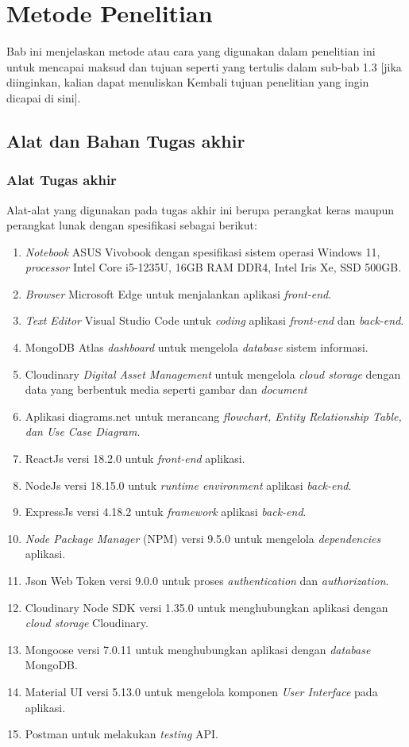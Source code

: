 \chapter{Metode Penelitian}

Bab ini menjelaskan metode atau cara yang digunakan dalam penelitian ini untuk 
mencapai maksud dan tujuan seperti yang tertulis dalam sub-bab 1.3 [jika diinginkan, kalian dapat menuliskan Kembali tujuan penelitian yang ingin dicapai di sini].

\section{Alat dan Bahan Tugas akhir}

\subsection{Alat Tugas akhir}

Alat-alat yang digunakan pada tugas akhir ini berupa perangkat keras maupun perangkat lunak dengan spesifikasi sebagai berikut:

\begin{enumerate}
	\item \textit{Notebook} ASUS Vivobook dengan spesifikasi sistem operasi Windows 11, \textit{processor} Intel Core i5-1235U, 16GB RAM DDR4, Intel Iris Xe, SSD 500GB.
	\item \textit{Browser} Microsoft Edge untuk menjalankan aplikasi \textit{front-end}.
	\item \textit{Text Editor} Visual Studio Code untuk \textit{coding} aplikasi \textit{front-end} dan \textit{back-end}.
	\item MongoDB Atlas \textit{dashboard} untuk mengelola \textit{database} sistem informasi.
	\item Cloudinary \textit{Digital Asset Management} untuk mengelola \textit{cloud storage} dengan data yang berbentuk media seperti gambar dan  \textit{document}
	\item Aplikasi diagrams.net untuk merancang \textit{flowchart, Entity Relationship Table, dan Use Case Diagram}.
	\item ReactJs versi 18.2.0 untuk \textit{front-end} aplikasi.
	\item NodeJs versi 18.15.0 untuk \textit{runtime environment} aplikasi \textit{back-end}.
	\item ExpressJs versi 4.18.2 untuk \textit{framework} aplikasi \textit{back-end}.
	\item \textit{Node Package Manager} (NPM) versi 9.5.0 untuk mengelola \textit{dependencies} aplikasi.
	\item Json Web Token versi 9.0.0 untuk proses \textit{authentication} dan \textit{authorization}.
	\item Cloudinary Node SDK versi 1.35.0 untuk menghubungkan aplikasi dengan \textit{cloud storage} Cloudinary.
	\item Mongoose versi 7.0.11 untuk menghubungkan aplikasi dengan \textit{database} MongoDB.
	\item Material UI versi 5.13.0 untuk mengelola komponen \textit{User Interface} pada aplikasi.
	\item Postman untuk melakukan \textit{testing} API.
\end{enumerate}
